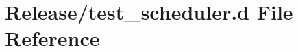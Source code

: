 \hypertarget{test__scheduler_8d}{}\section{Release/test\+\_\+scheduler.d File Reference}
\label{test__scheduler_8d}
